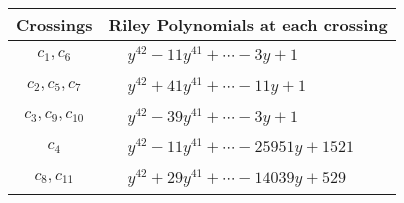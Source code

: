 \documentclass[1p]{elsarticle_modified}
\theoremstyle{definition}
\begin{document}
\begin{tabular}{m{50pt}|m{274pt}}
Crossings & \hspace{64pt}Riley Polynomials at each crossing \\
\hline $$\begin{aligned}c_{1},c_{6}\end{aligned}$$&$\begin{aligned}
&y^{42}-11 y^{41}+\cdots-3 y+1
\end{aligned}$\\
\hline $$\begin{aligned}c_{2},c_{5},c_{7}\end{aligned}$$&$\begin{aligned}
&y^{42}+41 y^{41}+\cdots-11 y+1
\end{aligned}$\\
\hline $$\begin{aligned}c_{3},c_{9},c_{10}\end{aligned}$$&$\begin{aligned}
&y^{42}-39 y^{41}+\cdots-3 y+1
\end{aligned}$\\
\hline $$\begin{aligned}c_{4}\end{aligned}$$&$\begin{aligned}
&y^{42}-11 y^{41}+\cdots-25951 y+1521
\end{aligned}$\\
\hline $$\begin{aligned}c_{8},c_{11}\end{aligned}$$&$\begin{aligned}
&y^{42}+29 y^{41}+\cdots-14039 y+529
\end{aligned}$\\
\hline
\end{tabular}
\vskip 2pc
\end{document}
